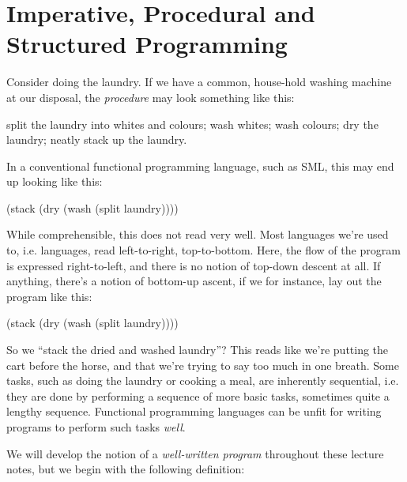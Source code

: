 \chapter{Imperative, Procedural and Structured Programming}

Consider doing the laundry. If we have a common, house-hold washing machine at
our disposal, the \emph{procedure} may look something like this:

\begin{code}
split the laundry into whites and colours;
wash whites;
wash colours;
dry the laundry;
neatly stack up the laundry.
\end{code}

In a conventional functional programming language, such as SML, this may end up
looking like this:

\begin{code}
(stack (dry (wash (split laundry))))
\end{code}

While comprehensible, this does not read very well. Most languages we're used
to, i.e.  languages, read
left-to-right, top-to-bottom. Here, the flow of the program is expressed
right-to-left, and there is no notion of top-down descent at all. If anything,
there's a notion of bottom-up ascent, if we for instance, lay out the program
like this:

\begin{codebox}
\li (stack
\zi   (dry
\zi     (wash
\zi       (split laundry))))
\end{codebox}

So we ``stack the dried and washed laundry''? This reads like we're putting the
cart before the horse, and that we're trying to say too much in one breath.
Some tasks, such as doing the laundry or cooking a meal, are inherently
sequential, i.e. they are done by performing a sequence of more basic tasks,
sometimes quite a lengthy sequence.  Functional programming languages can be
 unfit for writing programs to perform such tasks
\emph{well}.


We will develop the notion of a \emph{well-written program} throughout these
lecture notes, but we begin with the following definition:

